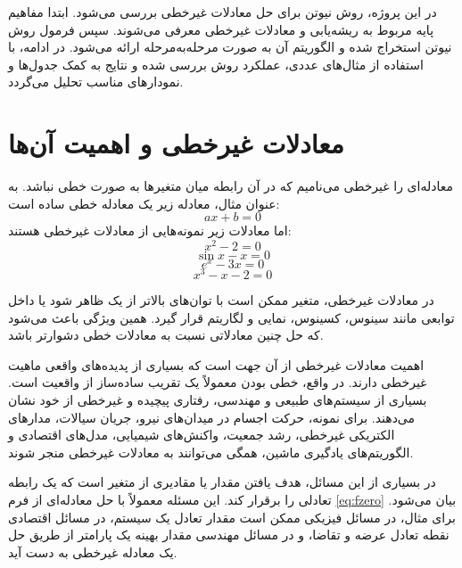 در این پروژه، روش نیوتن برای حل معادلات غیرخطی بررسی می‌شود. ابتدا مفاهیم پایه مربوط به ریشه‌یابی و معادلات غیرخطی معرفی می‌شوند. سپس فرمول روش نیوتن استخراج شده و الگوریتم آن به صورت مرحله‌به‌مرحله ارائه می‌شود. در ادامه، با استفاده از مثال‌های عددی، عملکرد روش بررسی شده و نتایج به کمک جدول‌ها و نمودارهای مناسب تحلیل می‌گردد.

\section{معادلات غیرخطی و اهمیت آن‌ها}
\label{sec:import}

معادله‌ای را غیرخطی می‌نامیم که در آن رابطه میان متغیرها به صورت خطی نباشد. به عنوان مثال، معادله زیر یک معادله خطی ساده است:
\begin{equation}
ax+b=0
\label{eq:linear}
\end{equation}
اما معادلات زیر نمونه‌هایی از معادلات غیرخطی هستند:
\begin{equation}
x^2-2=0
\label{eq:nonlinear1}
\end{equation}
\begin{equation}
\sin x - x = 0
\label{eq:nonlinear2}
\end{equation}
\begin{equation}
e^x - 3x = 0
\label{eq:nonlinear3}
\end{equation}
\begin{equation}
x^3 - x - 2 = 0
\label{eq:nonlinear4}
\end{equation}

در معادلات غیرخطی، متغیر ممکن است با توان‌های بالاتر از یک ظاهر شود یا داخل توابعی مانند سینوس، کسینوس، نمایی و لگاریتم قرار گیرد. همین ویژگی باعث می‌شود که حل چنین معادلاتی نسبت به معادلات خطی دشوارتر باشد.

اهمیت معادلات غیرخطی از آن جهت است که بسیاری از پدیده‌های واقعی ماهیت غیرخطی دارند. در واقع، خطی بودن معمولاً یک تقریب ساده‌ساز از واقعیت است. بسیاری از سیستم‌های طبیعی و مهندسی، رفتاری پیچیده و غیرخطی از خود نشان می‌دهند. برای نمونه، حرکت اجسام در میدان‌های نیرو، جریان سیالات، مدارهای الکتریکی غیرخطی، رشد جمعیت، واکنش‌های شیمیایی، مدل‌های اقتصادی و الگوریتم‌های یادگیری ماشین، همگی می‌توانند به معادلات غیرخطی منجر شوند.

در بسیاری از این مسائل، هدف یافتن مقدار یا مقادیری از متغیر است که یک رابطه تعادلی را برقرار کند. این مسئله معمولاً با حل معادله‌ای از فرم \eqref{eq:fzero} بیان می‌شود. برای مثال، در مسائل فیزیکی ممکن است مقدار تعادل یک سیستم، در مسائل اقتصادی نقطه تعادل عرضه و تقاضا، و در مسائل مهندسی مقدار بهینه یک پارامتر از طریق حل یک معادله غیرخطی به دست آید.

